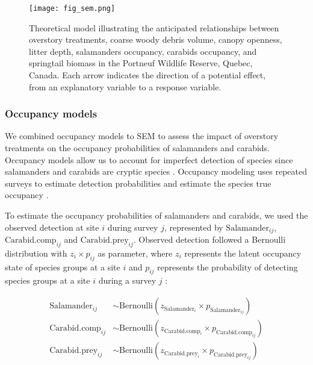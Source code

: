 \begin{figure}[ht]
	\centering
	\texttt{[image: fig\_sem.png]}
	\caption[Theoretical model illustrating the anticipated relationships between overstory treatments, environmental variables and species groups.]
  {Theoretical model illustrating the anticipated relationships between overstory treatments, coarse woody debris volume, canopy openness, litter depth,
   salamanders occupancy, carabids occupancy, and springtail biomass in the Portneuf Wildlife Reserve, Quebec, Canada. 
   Each arrow indicates the direction of a potential effect, from an explanatory variable to a response variable.}
	\label{fig:SEM}
\end{figure}  

\subsubsection{Occupancy models} 

We combined occupancy models to SEM to assess the impact of overstory treatments on the occupancy probabilities of salamanders and carabids.
Occupancy models allow us to account for imperfect detection of species since salamanders and carabids are cryptic species \citep{baileyEstimatingSiteOccupancy2004,spiersEstimatingSpeciesMisclassification2022}.
Occupancy modeling uses repeated surveys to estimate detection probabilities and estimate the species true occupancy \citep{mackenzieEstimatingSiteOccupancy2002,mazerolleMakingGreatLeaps2007}.

To estimate the occupancy probabilities of salamanders and carabids, we used the observed detection at site $i$ during survey $j$, 
represented by $\text{Salamander}_{ij}$, $\text{Carabid.comp}_{ij}$ and $\text{Carabid.prey}_{ij}$. Observed detection followed a Bernoulli distribution with $z_{i} \times p_{ij}$ as parameter, 
where $z_{i}$ represents the latent occupancy state of species groups at a site $i$ and $p_{ij}$ represents the probability of detecting species groups at a site $i$ during a survey $j$ :


\begin{align}
  \text{Salamander}_{ij} &\sim \text{Bernoulli}(z_{\text{Salamander}_i} \times p_{\text{Salamander}_{ij}}) \nonumber \\
  \text{Carabid.comp}_{ij} &\sim \text{Bernoulli}(z_{\text{Carabid.comp}_i} \times p_{\text{Carabid.comp}_{ij}})  \\
  \text{Carabid.prey}_{ij} &\sim \text{Bernoulli}(z_{\text{Carabid.prey}_i} \times p_{\text{Carabid.prey}_{ij}}) \nonumber
\end{align}


